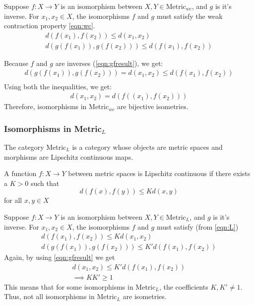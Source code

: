 \begin{frame}
    Suppose \(f:X\rightarrow Y\) is an isomorphism between \(X,Y\in \text{Metric}_{wc}\), and \(g\) is it's inverse. 
    For \(x_1,x_2\in X\), the isomorphisms \(f\) and \(g\) must satisfy the weak contraction property \autoref{eqn:wc}.
    \begin{gather*}
        d(f(x_1),f(x_2))\leq d(x_1,x_2)\\
        d(g(f(x_1)),g(f(x_2)))\leq d(f(x_1),f(x_2))
    \end{gather*}

    Because \(f\) and \(g\) are inverses (\autoref{eqn:gfresult}), we get: 
    \begin{gather*}
        d(g(f(x_1)),g(f(x_2)))=d(x_1, x_2)\leq d(f(x_1),f(x_2))\\
    \end{gather*}
    Using both the inequalities, we get:
    \begin{gather*}
         d(x_1,x_2)=d(f((x_1),f(x_2)))
    \end{gather*}
    \pause
    Therefore, isomorphisms in Metric\(_{wc}\) are bijective isometries.

\end{frame}

\begin{frame}
    \frametitle{Isomorphisms in Metric\(_{L}\)}
    The category Metric\(_{L}\) is a category whose objects are metric spaces and morphisms are Lipschitz continuous maps.
    \pause
    \begin{definition}
        A function \(f : X \rightarrow Y\) between metric spaces is
        Lipschitz continuous if there exists a \(K > 0\) such that
        \begin{equation}
            d(f(x),f(y))\leq Kd(x,y)
            \label{eqn:L}
        \end{equation}
        for all \(x,y\in X\)
    \end{definition}    

\end{frame}

\begin{frame}
    Suppose \(f:X\rightarrow Y\) is an isomorphism between \(X,Y\in \text{Metric}_{L}\), and \(g\) is it's inverse. 
    For \(x_1,x_2\in X\), the isomorphisms \(f\) and \(g\) must satisfy (from \autoref{eqn:L})
    \begin{gather*}
        d(f(x_1),f(x_2))\leq Kd(x_1,x_2)\\
        d(g(f(x_1)),g(f(x_2)))\leq K'd(f(x_1),f(x_2))
    \end{gather*}
    Again, by using \autoref{eqn:gfresult} we get
    \begin{gather*}
        d(x_1,x_2)\leq K'd(f(x_1),f(x_2))\\
        \implies KK' \geq 1
    \end{gather*}
    \pause
    This means that for some isomorphisms in Metric\(_{L}\), the coefficients \(K,K'\neq 1\). 
    Thus, not all isomorphisms in Metric\(_L\) are isometries.

\end{frame}


